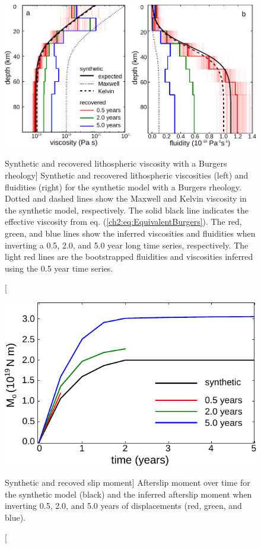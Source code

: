 \begin{figure}
\includegraphics{ch2/figures/Fig8.pdf}
\caption
[Synthetic and recovered lithospheric viscosity with a Burgers
rheology]
{Synthetic and recovered lithospheric viscosities (left) and
fluidities (right) for the synthetic model with a Burgers rheology.
Dotted and dashed lines show the Maxwell and Kelvin viscosity in the
synthetic model, respectively.  The solid black line indicates the
effective viscosity from eq. (\ref{ch2:eq:EquivalentBurgers}).  The red,
green, and blue lines show the inferred viscosities and fluidities
when inverting a 0.5, 2.0, and 5.0 year long time series,
respectively.  The light red lines are the bootstrapped fluidities and
viscosities inferred using the 0.5 year time series.}
\label{ch2:fig:8}
\end{figure}

\begin{figure}
\includegraphics{ch2/figures/Fig9.pdf}
\caption
[Synthetic and recoved slip moment]
{Afterslip moment over time for the synthetic model (black)
and the inferred afterslip moment when inverting 0.5, 2.0, and 5.0
years of displacements (red, green, and blue).}
\label{ch2:fig:9}
\end{figure}

